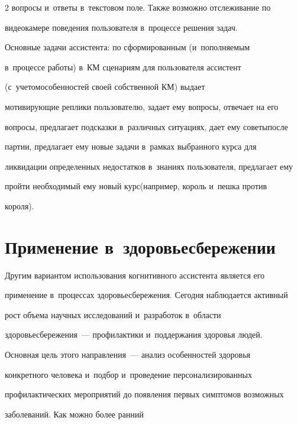 \begin{multicols}{2}
вопросы и~ответы в~текстовом поле. Также возможно отслеживание по 


видеокамере поведения пользователя в~процессе решения задач.


  


  Основные задачи ассистента: по сформированным (и~пополняемым 


в~процессе работы) в~КМ сценариям для пользователя ассистент 


(с~учетом\linebreak особенностей своей собственной КМ) выдает 


мотивирующие реплики пользователю, задает ему вопросы, отвечает на его 


вопросы, предлагает подсказки в~различных ситуациях, дает ему советы\linebreak после 


партии, предлагает ему новые задачи в~рамках выбранного курса для 


ликвидации определенных недостатков в~знаниях пользователя, предлагает ему 


пройти необходимый ему новый курс\linebreak (например, король и~пешка против 


короля). 





\section{Применение в~здоровьесбережении}





  Другим вариантом использования когнитивного ассистента является его 


применение в~процессах здоровьесбережения. Сегодня наблюдается активный 


рост объема научных исследований и~разработок в~области 


здоровьесбережения~--- профилактики и~поддержания здоровья людей. 


Основная цель этого направления~--- анализ особенностей здоровья 


конкретного человека и~подбор и~проведение персонализированных 


профилактических мероприятий до появления первых симптомов возможных 


заболеваний. Как можно более ранний\linebreak



\end{multicols}
